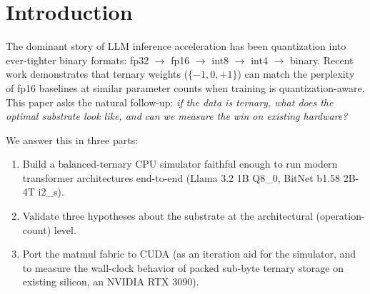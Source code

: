 \documentclass{article}
\begin{document}
\begin{abstract}
We are explicit about what is and is not ternary about these results.
The matmul-fabric speedup of $1.90\times$ over cuBLAS {INT8} tensor
cores at single-token gen is attributable to packed sub-byte storage
($4$ trits per byte), not to ternary arithmetic per se: the formal
analysis of Cuevas (2026) decomposes $\sim 1.88\times$ as a bandwidth
ratio (16 {MAC}s per $17$ bytes read versus $1/2$ for {INT8}), and our
own {ADD}-only experiment shows that eliminating multiplications does
not yield throughput on commodity {GPU}. The genuinely ternary
contribution is bit-exact reproduction of the {QAT}-trained BitNet
2B-4T model, where substrate-data alignment is semantically
meaningful. The per-op energy advantage that historically motivated
ternary {CPU}s---and that the simulator was designed to explore---is
\emph{analytically estimated} via an {ASIC} model
($33.4 \to 4.6$ nJ/token at $22 \to 3$nm, ternary ratio pinned to
Cuevas (2026) Prop.~2) but not yet silicon-measured; physical {FPGA}
validation remains the closing experiment. Related
{LUT}-based low-bit work on {CPU} \cite{tmac-eurosys-2025}, {FPGA}
\cite{lutmul-aspdac-2025,tellme-2025}, and {ASIC}
\cite{platinum-2025,cutie-2020} precedes ours; we contribute the
specific {GPU} \texttt{\_\_dp4a} packed-trit kernel design plus
end-to-end engine integration with bit-exact validation.
\end{abstract}


\section{Introduction}

The dominant story of {LLM} inference acceleration has been quantization
into ever-tighter binary formats: fp32 $\rightarrow$ fp16 $\rightarrow$
int8 $\rightarrow$ int4 $\rightarrow$ binary. Recent work
\citep{bitnet-original-2023, bitnet158-2024} demonstrates that ternary
weights ($\{-1, 0, +1\}$) can match the perplexity of fp16 baselines at
similar parameter counts when training is quantization-aware. This paper
asks the natural follow-up: \emph{if the data is ternary, what does the
optimal substrate look like, and can we measure the win on existing
hardware?}

We answer this in three parts:

\begin{enumerate}
  \item Build a balanced-ternary {CPU} simulator faithful enough to run
    modern transformer architectures end-to-end (Llama 3.2 1B Q8\_0,
    BitNet b1.58 2B-4T i2\_s).
  \item Validate three hypotheses about the substrate at the
    architectural (operation-count) level.
  \item Port the matmul fabric to {CUDA} (as an iteration aid for the
    simulator, and to measure the wall-clock behavior of packed sub-byte
    ternary storage on existing silicon, an {NVIDIA} {RTX} 3090).
\end{enumerate}
\end{document}
